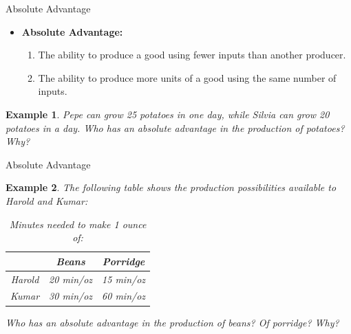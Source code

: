 \documentclass[xcolor={dvipsnames},pdf, hyperref={colorlinks=true, citecolor=ForestGreen, linkcolor=BlueViolet, urlcolor=Magenta}]{beamer}
\newtheorem{exmp}{Example}[section]
\theoremstyle{definition}
\newcommand{\defn}[1]{\textbf{#1}}
\newcommand{\ddp}[1]{{\textcolor{ForestGreen}{#1}}}
\begin{document}
\begin{frame}{Absolute Advantage}
	
	\begin{itemize}
	\item 	\defn{Absolute Advantage:} 
	\begin{enumerate}
			\item The ability to produce a good using fewer inputs than another producer.
			\item The ability to produce more units of a good using the same number of inputs.
		\end{enumerate}
	\end{itemize}
	
	\begin{exmp}
		Pepe can grow 25 potatoes in one day, while Silvia can grow 20 potatoes in a day. Who has an absolute advantage in the production of potatoes? Why?
	\end{exmp} 
	\pause \ddp{Pepe has AA because he can produce more potatoes than Silvia using the same number of inputs (1 day).}
\end{frame}




\begin{frame}[t]{Absolute Advantage}
		\begin{exmp} 
			The following table shows the production possibilities available to Harold and Kumar:
			
			\begin{table}[H]
				\caption*{Minutes needed to make 1 ounce of:}
				\centering
				\begin{tabular}{c|c|c|}
					
					& Beans & Porridge \\
					\hline
					Harold & 20 min/oz & 15 min/oz \\
					
					Kumar  & 30 min/oz & 60 min/oz \\
					
				\end{tabular}
			\end{table}
			
			Who has an absolute advantage in the production of beans? Of porridge? Why?
		\end{exmp}
		
	\pause 	\ddp{Harold has an AA in both goods because she can produce 1 oz of each good using fewer inputs than Kumar.}
		
	\end{frame}
\end{document}
